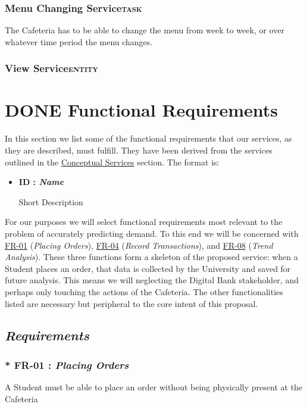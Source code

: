 \documentclass[11pt]{article}
\begin{document}
\subsubsection*{Menu Changing Service\hfill{}\textsc{task}}
\label{sec:orge7a7a0c}
The Cafeteria has to be able to change the menu from week to week,
or over whatever time period the menu changes.

\subsubsection{View Service\hfill{}\textsc{entity}}
\label{sec:orgef1408d}
\section{{\bfseries\sffamily DONE} Functional Requirements}
\label{sec:orgce0c1e3}

In this section we list some of the functional requirements that our
services, as they are described, must fulfill. They have been
derived from the services outlined in the \hyperref[sec:orgf8fad10]{Conceptual Services}
section. The format is:

\begin{itemize}
\item \textbf{ID : \emph{Name}}

Short Description
\end{itemize}

For our purposes we will select functional requirements most
relevant to the problem of accurately predicting demand. To this end
we will be concerned with \hyperref[orga25b036]{FR-01} (\emph{Placing Orders}), \hyperref[org248432e]{FR-04} (\emph{Record
Transactions}), and \hyperref[orge355598]{FR-08} (\emph{Trend Analysis}). These three functions
form a skeleton of the proposed service: when a Student places an
order, that data is collected by the University and saved for future
analysis. This means we will neglecting the Digital Bank
stakeholder, and perhaps only touching the actions of the
Cafeteria. The other functionalities listed are necessary but
peripheral to the core intent of this proposal.

\newpage
\subsection*{\emph{Requirements}}
\label{sec:org5f6e8ed}
\subsubsection*{* \label{orga25b036}FR-01 : \emph{Placing Orders}}
\label{sec:org19dc9fa}
A Student must be able to place an order without being physically
present at the Cafeteria
\end{document}
